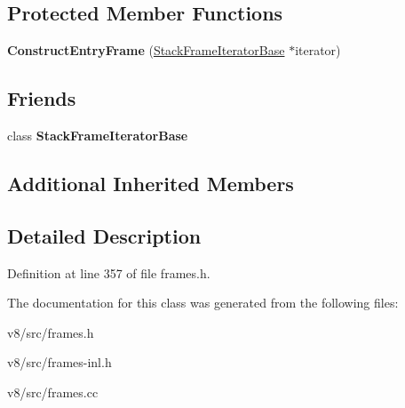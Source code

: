 \subsection*{Protected Member Functions}
\begin{DoxyCompactItemize}
\item 
\mbox{\label{classv8_1_1internal_1_1ConstructEntryFrame_af229c771a912f7d22c2dc6bd3bafe106}} 
{\bfseries Construct\+Entry\+Frame} (\mbox{\hyperlink{classv8_1_1internal_1_1StackFrameIteratorBase}{Stack\+Frame\+Iterator\+Base}} $\ast$iterator)
\end{DoxyCompactItemize}
\subsection*{Friends}
\begin{DoxyCompactItemize}
\item 
\mbox{\label{classv8_1_1internal_1_1ConstructEntryFrame_ac7310421866976ca454bbe11c5f926c3}} 
class {\bfseries Stack\+Frame\+Iterator\+Base}
\end{DoxyCompactItemize}
\subsection*{Additional Inherited Members}


\subsection{Detailed Description}


Definition at line 357 of file frames.\+h.



The documentation for this class was generated from the following files\+:\begin{DoxyCompactItemize}
\item 
v8/src/frames.\+h\item 
v8/src/frames-\/inl.\+h\item 
v8/src/frames.\+cc\end{DoxyCompactItemize}
